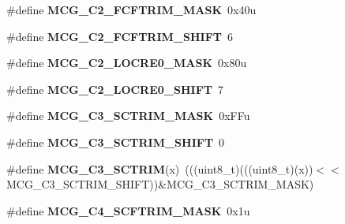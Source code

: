\begin{DoxyCompactItemize}
\item 
\#define {\bfseries M\+C\+G\+\_\+\+C2\+\_\+\+F\+C\+F\+T\+R\+I\+M\+\_\+\+M\+A\+SK}~0x40u\hypertarget{group__MCG__Register__Masks_ga45707a93b3c20e13c76dfda9ba5ff622}{}\label{group__MCG__Register__Masks_ga45707a93b3c20e13c76dfda9ba5ff622}

\item 
\#define {\bfseries M\+C\+G\+\_\+\+C2\+\_\+\+F\+C\+F\+T\+R\+I\+M\+\_\+\+S\+H\+I\+FT}~6\hypertarget{group__MCG__Register__Masks_ga59a90f18817b5c06e8d77879105becda}{}\label{group__MCG__Register__Masks_ga59a90f18817b5c06e8d77879105becda}

\item 
\#define {\bfseries M\+C\+G\+\_\+\+C2\+\_\+\+L\+O\+C\+R\+E0\+\_\+\+M\+A\+SK}~0x80u\hypertarget{group__MCG__Register__Masks_gae89f2e48b02a39563115d1a60dc8f16f}{}\label{group__MCG__Register__Masks_gae89f2e48b02a39563115d1a60dc8f16f}

\item 
\#define {\bfseries M\+C\+G\+\_\+\+C2\+\_\+\+L\+O\+C\+R\+E0\+\_\+\+S\+H\+I\+FT}~7\hypertarget{group__MCG__Register__Masks_gabc900505d9a12bd7a33c2a5e3cfdf02a}{}\label{group__MCG__Register__Masks_gabc900505d9a12bd7a33c2a5e3cfdf02a}

\item 
\#define {\bfseries M\+C\+G\+\_\+\+C3\+\_\+\+S\+C\+T\+R\+I\+M\+\_\+\+M\+A\+SK}~0x\+F\+Fu\hypertarget{group__MCG__Register__Masks_ga44433c6372539508fbf3090b591f3d89}{}\label{group__MCG__Register__Masks_ga44433c6372539508fbf3090b591f3d89}

\item 
\#define {\bfseries M\+C\+G\+\_\+\+C3\+\_\+\+S\+C\+T\+R\+I\+M\+\_\+\+S\+H\+I\+FT}~0\hypertarget{group__MCG__Register__Masks_ga8b5c3c55be188745fefec24b945110b7}{}\label{group__MCG__Register__Masks_ga8b5c3c55be188745fefec24b945110b7}

\item 
\#define {\bfseries M\+C\+G\+\_\+\+C3\+\_\+\+S\+C\+T\+R\+IM}(x)~(((uint8\+\_\+t)(((uint8\+\_\+t)(x))$<$$<$M\+C\+G\+\_\+\+C3\+\_\+\+S\+C\+T\+R\+I\+M\+\_\+\+S\+H\+I\+FT))\&M\+C\+G\+\_\+\+C3\+\_\+\+S\+C\+T\+R\+I\+M\+\_\+\+M\+A\+SK)\hypertarget{group__MCG__Register__Masks_ga66a74a75c9244dad3298474a2bf04de8}{}\label{group__MCG__Register__Masks_ga66a74a75c9244dad3298474a2bf04de8}

\item 
\#define {\bfseries M\+C\+G\+\_\+\+C4\+\_\+\+S\+C\+F\+T\+R\+I\+M\+\_\+\+M\+A\+SK}~0x1u\hypertarget{group__MCG__Register__Masks_ga7386e83fdee774ec5d6ec402bae1e432}{}\label{group__MCG__Register__Masks_ga7386e83fdee774ec5d6ec402bae1e432}


\end{DoxyCompactItemize}
